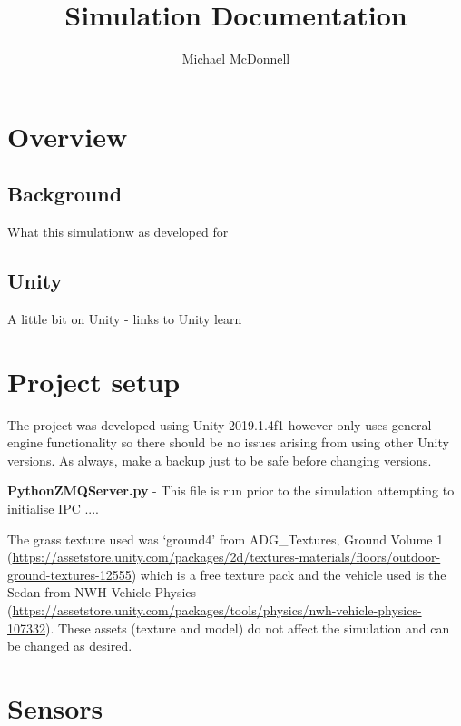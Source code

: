 \documentclass{article}
\begin{document}
\title{Simulation Documentation}
\author{Michael McDonnell}

\maketitle

\tableofcontents

\section*{Overview}

\subsection*{Background}

What this simulationw as developed for

\subsection*{Unity}
A little bit on Unity - links to Unity learn


\section{Project setup}

The project was developed using Unity 2019.1.4f1 however only uses general engine functionality so there should be no issues arising from using other Unity versions. As always, make a backup just to be safe before changing versions.

\textbf{PythonZMQServer.py} - This file is run prior to the simulation attempting to initialise IPC ....

The grass texture used was `ground4' from ADG\_Textures, Ground Volume 1 (\url{https://assetstore.unity.com/packages/2d/textures-materials/floors/outdoor-ground-textures-12555}) which is a free texture pack and the vehicle used is the Sedan from NWH Vehicle Physics (\url{https://assetstore.unity.com/packages/tools/physics/nwh-vehicle-physics-107332}). These assets (texture and model) do not affect the simulation and can be changed as desired.

\section{Sensors}
\end{document}
